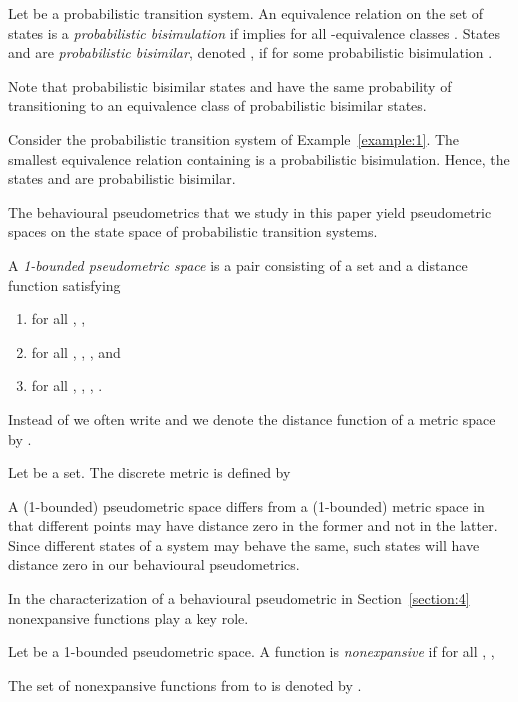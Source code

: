 \documentclass{LMCS}
\begin{document}
\begin{defi}
Let  be a probabilistic transition system. An equivalence relation  
on the set of states  is a {\sl probabilistic bisimulation\/} if 
 implies  
for all -equivalence classes .  States  and  are 
{\sl probabilistic bisimilar\/}, denoted , if  
for some probabilistic bisimulation .
\end{defi}

Note that probabilistic bisimilar states  and  have the same probability of 
transitioning to an equivalence class  of probabilistic bisimilar states.

\begin{exa}
Consider the probabilistic transition system of Example~\ref{example:1}.
The smallest equivalence relation containing  is a probabilistic bisimulation.  
Hence, the states  and  are probabilistic bisimilar.
\end{exa}

The behavioural pseudometrics that we study in this paper yield pseudometric spaces
on the state space of probabilistic transition systems.

\begin{defi}
\label{definition:3}
A {\sl 1-bounded pseudometric space\/} is a pair  consisting of a
set  and a distance function  satisfying
\begin{enumerate}[(1)]
\item
for all , ,
\item
for all , , , and
\item
for all , , , .
\end{enumerate}
Instead of  we often write  and we denote the distance function
of a metric space  by .
\end{defi}

\begin{exa}
Let  be a set.  The discrete metric 
is defined by

\end{exa}

A (1-bounded) pseudometric space differs from a (1-bounded) metric space
in that different points may have distance zero in the former and not in
the latter.  Since different states of a system may behave the same, 
such states will have distance zero in our behavioural pseudometrics.

In the characterization of a behavioural pseudometric in 
Section~\ref{section:4} nonexpansive functions play a key role.

\begin{defi}
Let  be a 1-bounded pseudometric space.  A function 
is {\sl nonexpansive\/} if for all , ,

The set of nonexpansive functions from  to  is denoted by
.
\end{defi}
\end{document}
